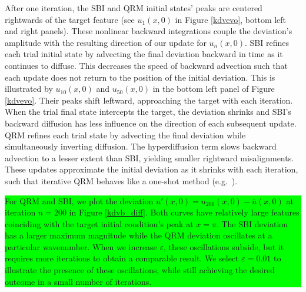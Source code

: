 \documentclass[%
 reprint,
 amsmath,amssymb,
 aps,
 pre,
]{revtex4-2}
\newcommand{\hly}[1]{\colorbox{lime}{\parbox{\columnwidth}{#1}}}
\begin{document}
After one iteration, the SBI and QRM initial states' peaks are centered rightwards of the target feature (see $u_1(x,0)$ in Figure \ref{kdvevo}, bottom left and right panels). 
These nonlinear backward integrations couple the deviation's amplitude with the resulting direction of our update for $u_n(x,0)$.
SBI refines each trial initial state by advecting the final deviation backward in time as it continues to diffuse. 
This decreases the speed of backward advection such that each update does not return to the position of the initial deviation.
This is illustrated by $u_{10}(x,0)$ and $u_{50}(x,0)$ in the bottom left panel of Figure \ref{kdvevo}.
Their peaks shift leftward, approaching the target with each iteration.
When the trial final state intercepts the target, the deviation shrinks and SBI's backward diffusion has less influence on the direction of each subsequent update.
QRM refines each trial state by advecting the final deviation while simultaneously inverting diffusion.
The hyperdiffusion term slows backward advection to a lesser extent than SBI, yielding smaller rightward misalignments. 
These updates approximate the initial deviation as it shrinks with each iteration, such that iterative QRM behaves like a one-shot method (e.g.~\cite{Nabi2022}).

\hspace{-0.45cm}\hly{For QRM and SBI, we plot the deviation $u'(x,0) = u_{200}(x,0) - \overline{u}(x,0)$ at iteration $n=200$ in Figure \ref{kdvb_diff}.
Both curves have relatively large features coinciding with the target initial condition's peak at $x=\pi$.
The SBI deviation has a larger maximum magnitude while the QRM deviation oscillates at a particular wavenumber.
When we increase $\varepsilon$, these oscillations subside, but it requires more iterations to obtain a comparable result.
We select $\varepsilon = 0.01$ to illustrate the presence of these oscillations, while still achieving the desired outcome in a small number of iterations.
}
\end{document}
